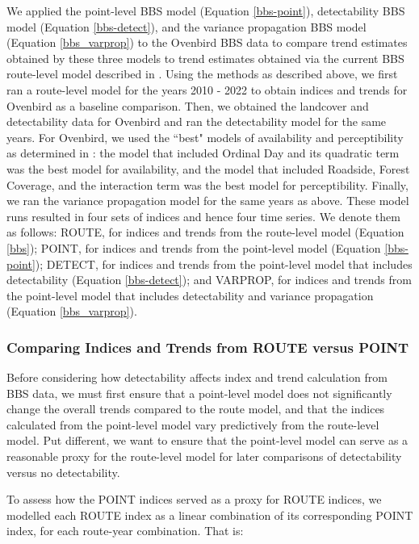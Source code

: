 \documentclass[12pt]{article}
\begin{document}
\par We applied the point-level BBS model (Equation \ref{bbs-point}), detectability BBS model (Equation \ref{bbs-detect}), and the variance propagation BBS model (Equation \ref{bbs_varprop}) to the Ovenbird BBS data to compare trend estimates obtained by these three models to trend estimates obtained via the current BBS route-level model described in \citet{smith_spatially_2023}.
Using the methods as described above, we first ran a route-level model for the years 2010 - 2022 to obtain indices and trends for Ovenbird as a baseline comparison.
Then, we obtained the landcover and detectability data for Ovenbird and ran the detectability model for the same years.
For Ovenbird, we used the ``best" models of availability and perceptibility as determined in \citet{edwards_point_2023}: the model that included Ordinal Day and its quadratic term was the best model for availability, and the model that included Roadside, Forest Coverage, and the interaction term was the best model for perceptibility.
Finally, we ran the variance propagation model for the same years as above.
These model runs resulted in four sets of indices and hence four time series.
We denote them as follows: ROUTE, for indices and trends from the route-level model (Equation \ref{bbs}); POINT, for indices and trends from the point-level model (Equation \ref{bbs-point}); DETECT, for indices and trends from the point-level model that includes detectability (Equation \ref{bbs-detect}); and VARPROP, for indices and trends from the point-level model that includes detectability and variance propagation (Equation \ref{bbs_varprop}).

\subsubsection{Comparing Indices and Trends from ROUTE versus POINT}\label{route-vs-point}

\par Before considering how detectability affects index and trend calculation from BBS data, we must first ensure that a point-level model does not significantly change the overall trends compared to the route model, and that the indices calculated from the point-level model vary predictively from the route-level model.
Put different, we want to ensure that the point-level model can serve as a reasonable proxy for the route-level model for later comparisons of detectability versus no detectability.

\par To assess how the POINT indices served as a proxy for ROUTE indices, we modelled each ROUTE index as a linear combination of its corresponding POINT index, for each route-year combination. 
That is:
\end{document}
